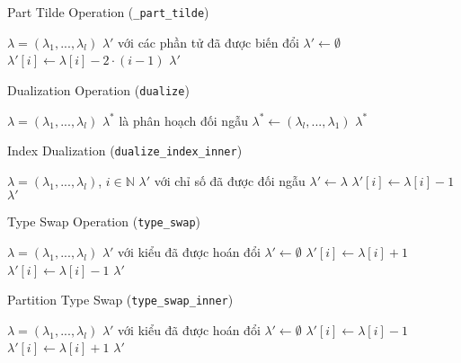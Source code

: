 \begin{algorithm}[H]
\caption{Part Tilde Operation (\texttt{\_part\_tilde})}
\begin{algorithmic}[1]
\REQUIRE $\lambda = (\lambda_1, ..., \lambda_l)$
\ENSURE $\lambda'$ với các phần tử đã được biến đổi
\STATE $\lambda' \gets \emptyset$
    \STATE $\lambda'[i] \gets \lambda[i] - 2 \cdot (i-1)$
\ENDFOR
\RETURN $\lambda'$
\end{algorithmic}
\end{algorithm}

\begin{algorithm}[H]
\caption{Dualization Operation (\texttt{dualize})}
\begin{algorithmic}[1]
\REQUIRE $\lambda = (\lambda_1, ..., \lambda_l)$
\ENSURE $\lambda^*$ là phân hoạch đối ngẫu
\STATE $\lambda^* \gets (\lambda_l, ..., \lambda_1)$
\RETURN $\lambda^*$
\end{algorithmic}
\end{algorithm}

\begin{algorithm}[H]
\caption{Index Dualization (\texttt{dualize\_index\_inner})}
\begin{algorithmic}[1]
\REQUIRE $\lambda = (\lambda_1, ..., \lambda_l)$, $i \in \mathbb{N}$
\ENSURE $\lambda'$ với chỉ số đã được đối ngẫu
\STATE $\lambda' \gets \lambda$
\STATE $\lambda'[i] \gets \lambda[i] - 1$
\RETURN $\lambda'$
\end{algorithmic}
\end{algorithm}

\begin{algorithm}[H]
\caption{Type Swap Operation (\texttt{type\_swap})}
\begin{algorithmic}[1]
\REQUIRE $\lambda = (\lambda_1, ..., \lambda_l)$
\ENSURE $\lambda'$ với kiểu đã được hoán đổi
\STATE $\lambda' \gets \emptyset$
        \STATE $\lambda'[i] \gets \lambda[i] + 1$
    \ELSE
        \STATE $\lambda'[i] \gets \lambda[i] - 1$
    \ENDIF
\ENDFOR
\RETURN $\lambda'$
\end{algorithmic}
\end{algorithm}

\begin{algorithm}[H]
\caption{Partition Type Swap (\texttt{type\_swap\_inner})}
\begin{algorithmic}[1]
\REQUIRE $\lambda = (\lambda_1, ..., \lambda_l)$
\ENSURE $\lambda'$ với kiểu đã được hoán đổi
\STATE $\lambda' \gets \emptyset$
        \STATE $\lambda'[i] \gets \lambda[i] - 1$
    \ELSE
        \STATE $\lambda'[i] \gets \lambda[i] + 1$
    \ENDIF
\ENDFOR
\RETURN $\lambda'$
\end{algorithmic}
\end{algorithm}

